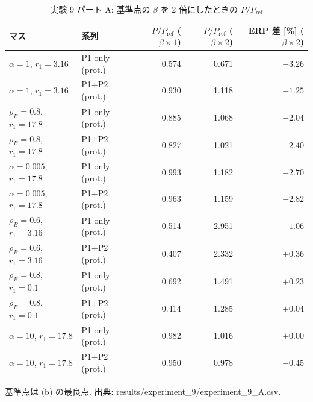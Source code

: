 \begin{table}[tbp]
\centering
\caption{実験 9 パート A: 基準点の $\beta$ を 2 倍にしたときの $P/P_{\mathrm{ref}}$}
\label{tab:exp9-beta2}
\small
\begin{tabular}{llrrr}
\toprule
マス & 系列 & $P/P_{\mathrm{ref}}$ ($\beta\times1$) & $P/P_{\mathrm{ref}}$ ($\beta\times2$) & ERP 差 [\%] ($\beta\times2$) \\
\midrule
$\alpha=1$, $r_1=3.16$ & P1 only (prot.) & 0.574 & 0.671 & $-3.26$ \\
$\alpha=1$, $r_1=3.16$ & P1+P2 (prot.) & 0.930 & 1.118 & $-1.25$ \\
$\rho_B=0.8$, $r_1=17.8$ & P1 only (prot.) & 0.885 & 1.068 & $-2.04$ \\
$\rho_B=0.8$, $r_1=17.8$ & P1+P2 (prot.) & 0.827 & 1.021 & $-2.40$ \\
$\alpha=0.005$, $r_1=17.8$ & P1 only (prot.) & 0.993 & 1.182 & $-2.70$ \\
$\alpha=0.005$, $r_1=17.8$ & P1+P2 (prot.) & 0.963 & 1.159 & $-2.82$ \\
$\rho_B=0.6$, $r_1=3.16$ & P1 only (prot.) & 0.514 & 2.951 & $-1.06$ \\
$\rho_B=0.6$, $r_1=3.16$ & P1+P2 (prot.) & 0.407 & 2.332 & $+0.36$ \\
$\rho_B=0.8$, $r_1=0.1$ & P1 only (prot.) & 0.692 & 1.491 & $+0.23$ \\
$\rho_B=0.8$, $r_1=0.1$ & P1+P2 (prot.) & 0.414 & 1.285 & $+0.04$ \\
$\alpha=10$, $r_1=17.8$ & P1 only (prot.) & 0.982 & 1.016 & $+0.00$ \\
$\alpha=10$, $r_1=17.8$ & P1+P2 (prot.) & 0.950 & 0.978 & $-0.45$ \\
\bottomrule
\end{tabular}
\par\smallskip
\footnotesize 基準点は (b) の最良点. 出典: results/experiment\_9/experiment\_9\_A.csv.
\end{table}
